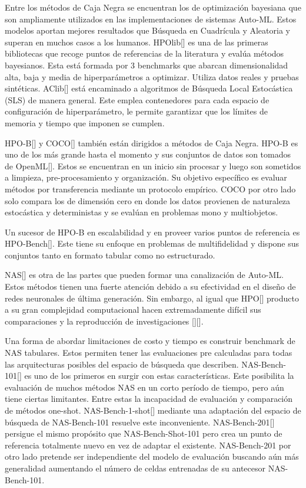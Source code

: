 Entre los métodos de Caja Negra se encuentran los de optimización bayesiana que son ampliamente utilizados en las implementaciones de sistemas Auto-ML. Estos modelos
aportan mejores resultados que Búsqueda en Cuadrícula y Aleatoria y superan en muchos casos a los humanos. HPOlib[\cite{63}] es una de las primeras 
bibliotecas que recoge puntos de referencias de la literatura y evalúa métodos bayesianos. Esta está formada por 3 benchmarks que abarcan dimensionalidad alta, baja y 
media de hiperparámetros a optimizar. Utiliza datos reales y pruebas sintéticas. AClib[\cite{62}] está encaminado a algoritmos de Búsqueda Local Estocástica (SLS) 
de manera general. Este emplea contenedores para cada espacio de configuración de hiperparámetro, le permite garantizar que los límites de memoria y tiempo que imponen 
se cumplen. 

HPO-B[\cite{61}] y COCO[\cite{60}] también están dirigidos a métodos de Caja Negra. HPO-B es uno de los más grande hasta el momento y sus conjuntos de datos son 
tomados de OpenML[\cite{43}]. Estos se encuentran en un inicio sin procesar y luego son sometidos a limpieza, pre-procesamiento y organización. 
Su objetivo específico es evaluar métodos por transferencia mediante un protocolo empírico. COCO por otro lado solo compara los de dimensión cero en donde los datos 
provienen de naturaleza estocástica y deterministas y se evalúan en problemas mono y multiobjetos.

Un sucesor de HPO-B en escalabilidad y en proveer varios puntos de referencia es HPO-Bench[\cite{50}]. Este tiene su enfoque en problemas de multifidelidad y 
dispone sus conjuntos tanto en formato tabular como no estructurado. 

NAS[\cite{35}] es otra de las partes que pueden formar una canalización de Auto-ML. Estos métodos tienen una fuerte atención debido a su efectividad en el diseño de 
redes neuronales de última generación. Sin embargo, al igual que HPO[\cite{35}] producto a su gran complejidad computacional hacen extremadamente difícil sus 
comparaciones y la reproducción de investigaciones [\cite{55}][\cite{59}].

Una forma de abordar limitaciones de costo y tiempo es construir benchmark de NAS tabulares. Estos permiten tener las evaluaciones 
pre calculadas para todas las arquitecturas posibles del espacio de búsqueda que describen. NAS-Bench-101[\cite{49}] es uno de los primeros en surgir con estas 
características. Este posibilita la evaluación de muchos métodos NAS en un corto período de tiempo, pero aún tiene ciertas limitantes. Entre estas la incapacidad de 
evaluación y comparación de métodos one-shot. NAS-Bench-1-shot[\cite{55}] mediante una adaptación del espacio de búsqueda de NAS-Bench-101 resuelve este inconveniente. 
NAS-Bench-201[\cite{56}] persigue el mismo propósito que NAS-Bench-Shot-101 pero crea un punto de referencia totalmente nuevo en vez de adaptar el existente. 
NAS-Bench-201 por otro lado pretende ser independiente del modelo de evaluación buscando aún más generalidad aumentando el número de celdas entrenadas de su antecesor 
NAS-Bench-101.

